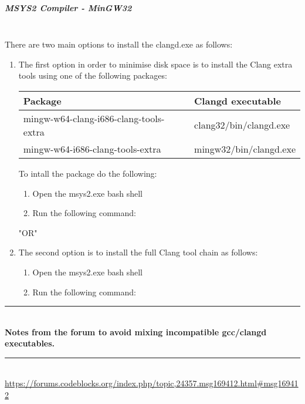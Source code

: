     \subparagraph*{MSYS2 Compiler - MinGW32} \hspace{0pt} \\
     There are two main options to install the clangd.exe as follows:
     \begin{enumerate}[noitemsep]
     \item The first option in order to  minimise disk space is to install the Clang extra tools using one of the following packages:
        {\footnotesize
        \begin{longtable}{|l|l|}\hline
        \textbf{Package}                            & \textbf{Clangd executable}    \\ \hline
        mingw-w64-clang-i686-clang-tools-extra      & clang32/bin/clangd.exe        \\
        mingw-w64-i686-clang-tools-extra            & mingw32/bin/clangd.exe        \\ \hline
        \end{longtable}
        \par}

        To intall the package do the following:
        \begin{enumerate}[noitemsep]
        \item Open the msys2.exe bash shell 
        \item Run the following command:\newline
              \newline
        \end{enumerate}

        "OR" \newline

     \item The second option is to install the full Clang tool chain as follows:
        \begin{enumerate}[noitemsep]
        \item Open the msys2.exe bash shell 
        \item Run the following command:\\
        \end{enumerate}
    \end{enumerate}

\rule{\textwidth}{0.4pt} \\    
    \textbf{Notes from the \codeblocks forum to avoid mixing incompatible gcc/clangd executables.}\\
\rule{\textwidth}{0.4pt} \\  
    {\small \url{https://forums.codeblocks.org/index.php/topic,24357.msg169412.html#msg169412}}

